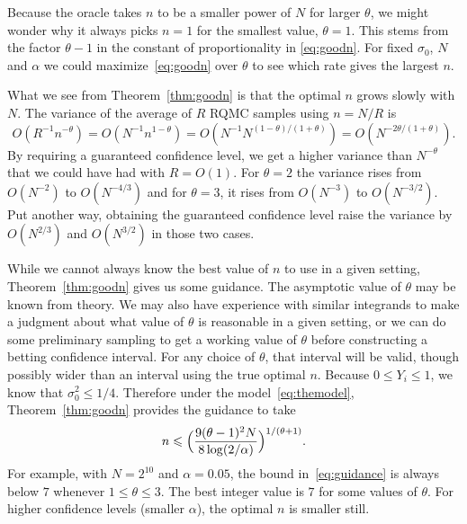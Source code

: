 \documentclass{article}
\newcommand{\art}[1]{\begingroup\color{blue}#1\endgroup}
\renewcommand{\le}{\leqslant}
\begin{document}
Because the oracle takes $n$ to be a smaller
power of $N$ for larger $\theta$, we might
wonder why it always picks $n=1$ for the smallest value, $\theta=1$. 
This stems from the factor $\theta-1$ in the constant of proportionality
in \eqref{eq:goodn}.
For fixed $\sigma_0$, $N$ and $\alpha$ we could 
maximize~\eqref{eq:goodn} over $\theta$
to see which rate gives the largest $n$.

What we see from Theorem~\ref{thm:goodn} is that the optimal
$n$ grows slowly with $N$. The variance of the average of $R$
RQMC samples using $n=N/R$ is
$$
O(R^{-1}n^{-\theta}) = O( N^{-1}n^{1-\theta})
= O( N^{-1}N^{(1-\theta)/(1+\theta)})
= O( N^{-2\theta/(1+\theta)}).
$$
By requiring a guaranteed confidence level, we
get a higher variance than $N^{-\theta}$
that we could have had with $R=O(1)$.
For $\theta=2$ the variance rises
from $O(N^{-2})$ to $O(N^{-4/3})$
and for $\theta=3$, it rises from
$O(N^{-3})$ to $O(N^{-3/2})$.
Put another way, obtaining the guaranteed confidence
level raise the variance by $O(N^{2/3})$
and $O(N^{3/2})$ in those two cases.

\art{While we cannot always know the best value of $n$ to use
in a given setting, Theorem~\ref{thm:goodn} gives us some guidance.
The asymptotic value of $\theta$ may be known from theory.
We may also have experience with similar integrands to make a
judgment about what value of $\theta$ is reasonable in a given
setting, or we can do some preliminary sampling to get a working
value of $\theta$ before constructing a betting confidence interval.
For any choice of $\theta$, that interval will be valid, though possibly 
wider than an interval using the true optimal $n$.
Because $0\le Y_i\le1$, we know that $\sigma_0^2\le 1/4$. Therefore
under the model~\eqref{eq:themodel}, Theorem~\ref{thm:goodn}
provides the guidance to take
\begin{align}\label{eq:guidance}
n\le \Bigl(\frac{9(\theta-1)^2N}{8\log(2/\alpha)}\Bigr)^{1/(\theta+1)}.
\end{align}
For example, with $N=2^{10}$ and $\alpha=0.05$, the bound in~\eqref{eq:guidance}
is always below $7$ whenever $1\le\theta\le3$. The best integer
value is $7$ for some values of $\theta$.
For higher confidence levels (smaller $\alpha$), the optimal
$n$ is smaller still.
}
\end{document}
